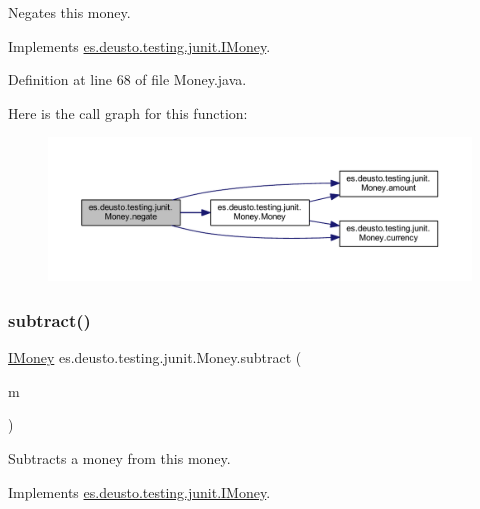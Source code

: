 Negates this money. 

Implements \mbox{\hyperlink{interfacees_1_1deusto_1_1testing_1_1junit_1_1_i_money_a741967d7aa89055b6873619303b11385}{es.\+deusto.\+testing.\+junit.\+I\+Money}}.



Definition at line 68 of file Money.\+java.

Here is the call graph for this function\+:\nopagebreak
\begin{figure}[H]
\begin{center}
\leavevmode
\includegraphics[width=350pt]{classes_1_1deusto_1_1testing_1_1junit_1_1_money_ae5f0bc3ea87f1fd55d6478653b8f2e36_cgraph}
\end{center}
\end{figure}
\mbox{\label{classes_1_1deusto_1_1testing_1_1junit_1_1_money_aada973cd1a31410ed2b7e5d2ae6bc2e9}} 
\subsubsection{\texorpdfstring{subtract()}{subtract()}}
{\footnotesize\ttfamily \mbox{\hyperlink{interfacees_1_1deusto_1_1testing_1_1junit_1_1_i_money}{I\+Money}} es.\+deusto.\+testing.\+junit.\+Money.\+subtract (\begin{DoxyParamCaption}\item[{\mbox{\hyperlink{interfacees_1_1deusto_1_1testing_1_1junit_1_1_i_money}{I\+Money}}}]{m }\end{DoxyParamCaption})}

Subtracts a money from this money. 

Implements \mbox{\hyperlink{interfacees_1_1deusto_1_1testing_1_1junit_1_1_i_money_a1fb4981aa759e3fe0679654bec7a8b61}{es.\+deusto.\+testing.\+junit.\+I\+Money}}.



